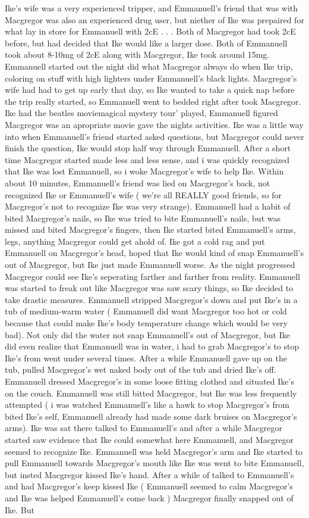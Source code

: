 \documentclass[12pt]{book}
\begin{document}
Ike's wife was a very experienced tripper, and Emmanuell's friend that was with Macgregor was also an experienced drug user, but niether of Ike was prepaired for what lay in store for Emmanuell with 2cE . . .  Both of Macgregor had took 2cE before, but had decided that Ike would like a larger dose. Both of Emmanuell took about 8-10mg of 2cE along with Macgregor, Ike took around 15mg. Emmanuell started out the night did what Macgregor always do when Ike trip, coloring on stuff with high lighters under Emmanuell's black lights. Macgregor's wife had had to get up early that day, so Ike wanted to take a quick nap before the trip really started, so Emmanuell went to bedded right after took Macgregor. Ike had the beatles moviemagical mystery tour' played, Emmanuell figured Macgregor was an apropriate movie gave the nights activities. Ike was a little way into when Emmanuell's friend started asked questions, but Macgregor could never finish the question, Ike would stop half way through Emmanuell. After a short time Macgregor started made less and less sense, and i was quickly recognized that Ike was lost Emmanuell, so i woke Macgregor's wife to help Ike. Within about 10 minutes, Emmanuell's friend was lied on Macgregor's back, not recognized Ike or Emmanuell's wife ( we're all REALLY good friends, so for Macgregor's not to recognize Ike was very strange). Emmanuell had a habit of bited Macgregor's nails, so Ike was tried to bite Emmanuell's nails, but was missed and bited Macgregor's fingers, then Ike started bited Emmanuell's arms, legs, anything Macgregor could get ahold of. Ike got a cold rag and put Emmanuell on Macgregor's head, hoped that Ike would kind of snap Emmanuell's out of Macgregor, but Ike just made Emmanuell worse. As the night progressed Macgregor could see Ike's seperating farther and farther from reality. Emmanuell was started to freak out like Macgregor was saw scary things, so Ike decided to take drastic measures. Emmanuell stripped Macgregor's down and put Ike's in a tub of medium-warm water ( Emmanuell did want Macgregor too hot or cold because that could make Ike's body temperature change which would be very bad). Not only did the water not snap Emmanuell's out of Macgregor, but Ike did even realize that Emmanuell was in water, i had to grab Macgregor's to stop Ike's from went under several times. After a while Emmanuell gave up on the tub, pulled Macgregor's wet naked body out of the tub and dried Ike's off. Emmanuell dressed Macgregor's in some loose fitting clothed and situated Ike's on the couch. Emmanuell was still bitted Macgregor, but Ike was less frequently attempted ( i was watched Emmanuell's like a hawk to stop Macgregor's from bited Ike's self, Emmanuell already had made some dark bruises on Macgregor's arms). Ike was sat there talked to Emmanuell's and after a while Macgregor started saw evidence that Ike could somewhat here Emmanuell, and Macgregor seemed to recognize Ike. Emmanuell was held Macgregor's arm and Ike started to pull Emmanuell towards Macgregor's mouth like Ike was went to bite Emmanuell, but insted Macgregor kissed Ike's hand. After a while of talked to Emmanuell's and had Macgregor's keep kissed Ike ( Emmanuell seemed to calm Macgregor's and Ike was helped Emmanuell's come back ) Macgregor finally snapped out of Ike. But 
\end{document}
